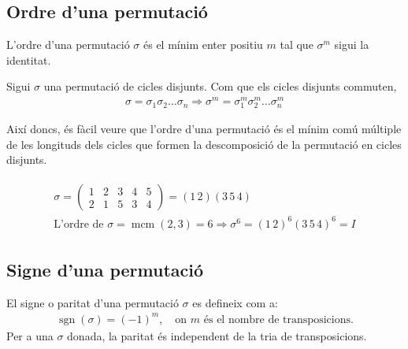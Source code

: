 \subsection{Ordre d'una permutació}
L'ordre d'una permutació $\sigma$ és el mínim enter positiu $m$ tal que $\sigma^{m}$ sigui la identitat.

Sigui $\sigma$ una permutació de cicles disjunts. Com que els cicles disjunts commuten, 
\begin{align}
    \sigma = \sigma_{1} \sigma_{2} \dots \sigma_{n} \Rightarrow \sigma^{m} = \sigma_{1}^{m} \sigma_{2}^{m} \dots \sigma_{n}^{m} 
\end{align}

Així doncs, és fàcil veure que l'ordre d'una permutació és el mínim comú múltiple de les longituds dels cicles que formen la descomposició de la permutació en cicles disjunts. 
\begin{example}
\begin{align*}
\begin{gathered}
    \sigma =\begin{pmatrix} 1 & 2 & 3 & 4 & 5 \\ 2 & 1 & 5 & 3 & 4 \end{pmatrix} = (1 \, 2) (3 \, 5 \, 4) \\
    \text{L'ordre de $\sigma$} = \operatorname{mcm} (2 , 3) = 6 \Rightarrow \sigma^{6} = (1 \, 2)^{6} (3 \, 5 \, 4)^{6} = I 
\end{gathered}
\end{align*}
\end{example}

\subsection{Signe d'una permutació}
El signe o paritat d'una permutació $\sigma$ es defineix com a:
\begin{align}
    \operatorname{sgn} (\sigma) = (-1)^{m}, \quad \text{on } m \text{ és el nombre de transposicions.}
\end{align}
Per a una $\sigma$ donada, la paritat és independent de la tria de transposicions. 